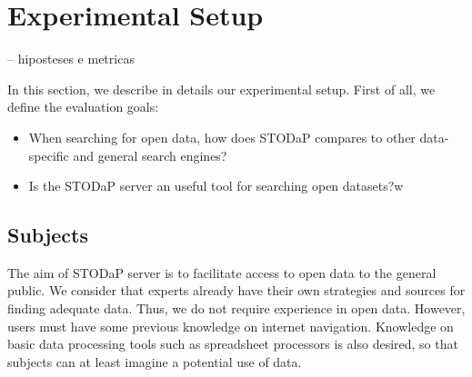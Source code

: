 \section{Experimental Setup}
\label{sec:setup}

-- hiposteses e metricas


In this section, we describe in details our experimental setup.
First of all, we define the evaluation goals:
\begin{itemize}
	\item When searching for open data, how does STODaP compares to other data-specific and general search engines?
	\item Is the STODaP server an useful tool for searching open datasets?w
\end{itemize}

\subsection{Subjects}

The aim of STODaP server is to facilitate access to open data to the general public.
We consider that experts already have their own strategies and sources for finding adequate data.
Thus, we do not require experience in open data.
However, users must have some previous knowledge on internet navigation. 
Knowledge on basic data processing tools such as spreadsheet processors is also desired, so that subjects can at least imagine a potential use of data.

